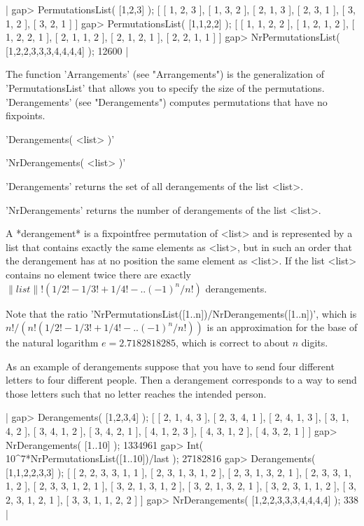 |    gap> PermutationsList( [1,2,3] );
    [ [ 1, 2, 3 ], [ 1, 3, 2 ], [ 2, 1, 3 ], [ 2, 3, 1 ], [ 3, 1, 2 ],
      [ 3, 2, 1 ] ]
    gap> PermutationsList( [1,1,2,2] );
    [ [ 1, 1, 2, 2 ], [ 1, 2, 1, 2 ], [ 1, 2, 2, 1 ], [ 2, 1, 1, 2 ],
      [ 2, 1, 2, 1 ], [ 2, 2, 1, 1 ] ]
    gap> NrPermutationsList( [1,2,2,3,3,3,4,4,4,4] );
    12600 |

The function 'Arrangements' (see "Arrangements") is the generalization of
'PermutationsList'   that  allows  you  to specify   the  size   of   the
permutations.  'Derangements' (see "Derangements") computes  permutations
that have no fixpoints.

%

'Derangements( <list> )'

'NrDerangements( <list> )'

'Derangements' returns the set of all derangements of the list <list>.

'NrDerangements' returns the number of derangements of the list <list>.

A   *derangement* is  a   fixpointfree  permutation  of   <list>   and is
represented by a list that contains exactly the  same elements as <list>,
but in such  an order  that the  derangement has at  no position the same
element as  <list>.  If the  list  <list> contains no element twice there
are  exactly  $\|list\|!  (1/2!   -  1/3!    +  1/4!  -  ..   (-1)^n/n!)$
derangements.

Note that the  ratio 'NrPermutationsList([1..n])/NrDerangements([1..n])',
which  is  $n!  /  (n!   (1/2!  -  1/3!  + 1/4!  - .. (-1)^n/n!))$  is an
approximation for the base of the natural logarithm  $e =  2.7182818285$,
which is correct to about $n$ digits.

As an  example of  derangements suppose    that  you have  to  send  four
different letters  to   four  different  people.    Then  a   derangement
corresponds  to a way  to send those letters such  that no letter reaches
the intended person.

|    gap> Derangements( [1,2,3,4] );
    [ [ 2, 1, 4, 3 ], [ 2, 3, 4, 1 ], [ 2, 4, 1, 3 ], [ 3, 1, 4, 2 ],
      [ 3, 4, 1, 2 ], [ 3, 4, 2, 1 ], [ 4, 1, 2, 3 ], [ 4, 3, 1, 2 ],
      [ 4, 3, 2, 1 ] ]
    gap> NrDerangements( [1..10] );
    1334961
    gap> Int( 10^7*NrPermutationsList([1..10])/last );
    27182816
    gap> Derangements( [1,1,2,2,3,3] );
    [ [ 2, 2, 3, 3, 1, 1 ], [ 2, 3, 1, 3, 1, 2 ], [ 2, 3, 1, 3, 2, 1 ],
      [ 2, 3, 3, 1, 1, 2 ], [ 2, 3, 3, 1, 2, 1 ], [ 3, 2, 1, 3, 1, 2 ],
      [ 3, 2, 1, 3, 2, 1 ], [ 3, 2, 3, 1, 1, 2 ], [ 3, 2, 3, 1, 2, 1 ],
      [ 3, 3, 1, 1, 2, 2 ] ]
    gap> NrDerangements( [1,2,2,3,3,3,4,4,4,4] );
    338 |


